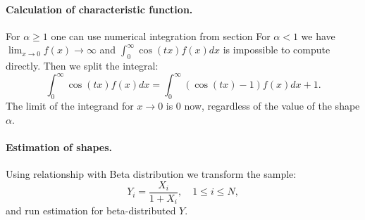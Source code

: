 \documentclass[a4paper,11pt]{article}
\theoremstyle{plain}
\theoremstyle{definition}
\begin{document}
	\paragraph{Calculation of characteristic function.} For $\alpha \geq 1$ one can use numerical integration from section %
	For $\alpha < 1$ we have $\lim_{x \rightarrow 0} f(x) \rightarrow \infty$ and $\int_{0}^{\infty} \cos(tx)f(x) dx$ is impossible to compute directly. Then we split the integral:
	\[
	\int_{0}^{\infty} \cos(tx)f(x) dx = \int_{0}^{\infty}(\cos(tx)-1) f(x) dx + 1.
	\]
	The limit of the integrand for $x \rightarrow 0$ is $0$ now, regardless of the value of the shape $\alpha$.
	
	\paragraph{Estimation of shapes.} Using relationship with Beta distribution we transform the sample:
	\[ Y_i = \frac{X_i}{1+X_i}, \quad 1 \leq i \leq N, \]
	and run estimation for beta-distributed $Y$.

	\pagebreak
\end{document}
